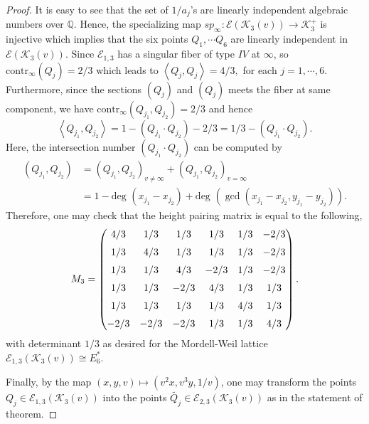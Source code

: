\documentclass[11pt]{amsart}
\newcommand{\Q}{{\mathbb Q}}
\newcommand{\Ee}{{\mathcal E}}
\newcommand{\KK}{{\mathcal K}}
\numberwithin{equation}{section}
\numberwithin{table}{section}
\newcommand\<{\langle}
\def\deg{\mbox{deg }}
\begin{document}
\begin{proof}
	It is easy to see  that  the set of $1/a_j$'s are linearly independent algebraic numbers over $\Q$.  Hence,  the specializing map $sp_{\infty}: \Ee(\KK_3(v)) \rightarrow \KK_3^+$ is injective which implies that the six points $Q_1, \cdots Q_6$ are linearly independent in   $\Ee(\KK_3(v))$. 
	Since $\Ee_{1, 3}$ has a singular fiber of type $IV$ at $\infty$, so $\text{contr}_\infty(Q_j)= 2/3$ which leads to 
	$ \left\langle Q_j, Q_j\right\rangle = 4/3,$ for each $j=1,\cdots, 6$.
	Furthermore,  since   the sections  $(Q_j)$ and  $(Q_j)$ meets the fiber at same component,  we have  $\text{contr}_\infty (Q_{j_1}, Q_{j_2})= 2/3$ and hence 
	$$\left\langle Q_{j_1}, Q_{j_2}\right\rangle = 1 - (Q_{j_1}\cdot  Q_{j_2})- 2/3= 1/3 - (Q_{j_1}\cdot  Q_{j_2}).$$ 
	Here, the intersection number $(Q_{j_1}\cdot  Q_{j_2})$ can be computed by 
	\begin{align*}
		\left( Q_{j_1}, Q_{j_2}\right)& = \left( Q_{j_1}, Q_{j_2}\right)_{v\neq \infty} +\left( Q_{j_1}, Q_{j_2}\right)_{v=\infty} \\
		& = 1- \deg(x_{j_1}-x_{j_2}) +\deg( \gcd (x_{j_1}-x_{j_2}, y_{j_1}-y_{j_2})  ).
	\end{align*}
	Therefore, one may check that  the height pairing matrix   is equal to the following,
	$$M_3=  \begin{pmatrix} 
		4/3  & 1/3  & 1/3  & 1/3  & 1/3  & -2/3
	\\ \noalign{\medskip}
	1/3  & 4/3  & 1/3  & 1/3  & 1/3  & -2/3\\ \noalign{\medskip}
	1/3  & 1/3  & 4/3  & -2/3  & 1/3  & -2/3\\ \noalign{\medskip}
	1/3  & 1/3  & -2/3  & 4/3  & 1/3  & 1/3	\\ \noalign{\medskip}
	1/3  & 1/3  & 1/3  & 1/3  & 4/3  & 1/3\\ \noalign{\medskip}
	-2/3  & -2/3  & -2/3  & 1/3  & 1/3  & 4/3
	 \end{pmatrix}. 	$$
	with determinant $1/3$ as desired for the Mordell-Weil lattice $\Ee_{1,3}(\KK_3(v)) \cong E_6^*.$
	
	Finally, by the map $(x, y, v) \mapsto (v^2 x, v^3 y, 1/v)$, one may transform the points
	$Q_j \in \Ee_{1, 3}(\KK_3(v))$
	into the points $\widetilde{Q_j} \in \Ee_{2, 3}(\KK_3(v))$	 as in the statement of theorem.
\end{proof}	








\end{document}
